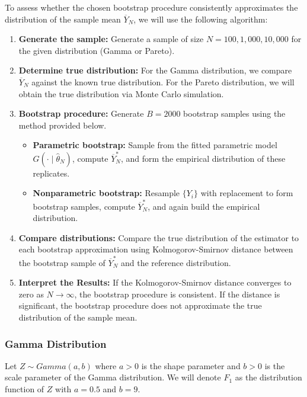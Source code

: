 \documentclass{article}
\begin{document}
To assess whether the chosen bootstrap procedure consistently approximates the distribution of the sample mean \(\overline{Y}_N\), we will use the following algorithm:

\begin{enumerate}
  \item \textbf{Generate the sample:} Generate a sample of size \(N = 100, 1,000, 10,000\) for the given distribution (Gamma or Pareto).
  \item \textbf{Determine true distribution:} For the Gamma distribution, we compare \(\overline{Y}_N\) against the known true distribution. For the Pareto distribution, we will obtain the true distribution via Monte Carlo simulation.
  \item \textbf{Bootstrap procedure:} Generate \(B = 2000\) bootstrap samples using the method provided below.
    \begin{itemize}
        \item \textbf{Parametric bootstrap:} Sample from the fitted parametric model \(G(\cdot \mid \hat{\theta}_N)\), compute \(\overline{Y}_N^*\), and form the empirical distribution of these replicates.
        \item \textbf{Nonparametric bootstrap:} Resample \(\{Y_i\}\) with replacement to form bootstrap samples, compute \(\overline{Y}_N^*\), and again build the empirical distribution.
    \end{itemize}
  \item \textbf{Compare distributions:} Compare the true distribution of the estimator to each bootstrap approximation using Kolmogorov-Smirnov distance between the bootstrap sample of \(\overline{Y}_N^*\) and the reference distribution.
  \item \textbf{Interpret the Results:} If the Kolmogorov-Smirnov distance converges to zero as \(N \to \infty\), the bootstrap procedure is consistent. If the distance is significant, the bootstrap procedure does not approximate the true distribution of the sample mean.
\end{enumerate}

\subsubsection{Gamma Distribution}

Let \(Z \sim Gamma(a, b)\) where \(a > 0\) is the shape parameter and \(b > 0\) is the scale parameter of the Gamma distribution. We will denote \(F_1\) as the distribution function of \(Z\) with \(a = 0.5\) and \(b = 9\).
\end{document}
